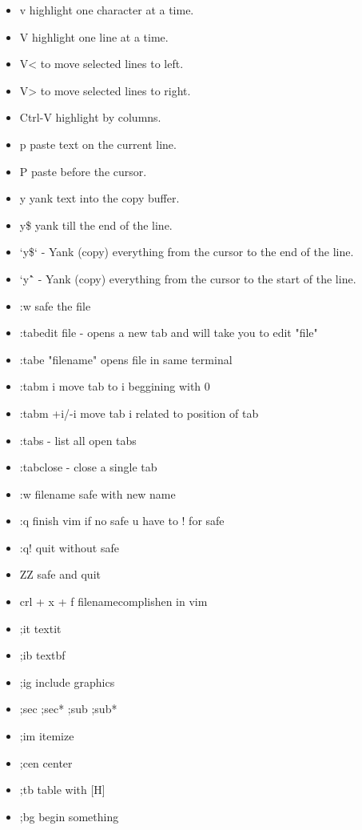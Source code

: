 \documentclass[12pt]{article}
\begin{document}
\begin{itemize}
    \item v highlight one character at a time.
    \item V highlight one line at a time.
    \item V< to move selected lines to left.
    \item V> to move selected lines to right.
    \item Ctrl-V highlight by columns.
    \item p paste text on the current line.
    \item P paste before the cursor.
    \item y yank text into the copy buffer.
    \item y\$ yank till the end of the line.
    \item `y\$` - Yank (copy) everything from the cursor to the end of the line.
    \item `y\^` - Yank (copy) everything from the cursor to the start of the line.\\

    \item :w  safe the file
    \item :tabedit file - opens a new tab and will take you to edit "file"
    \item :tabe "filename" opens file in same terminal 
    \item :tabm i move tab to i beggining with 0
    \item :tabm +i/-i move tab i related to position of tab
    \item :tabs - list all open tabs
    \item :tabclose - close a single tab
    \item :w filename safe with new name
    \item :q finish vim if no safe u have to ! for safe
    \item :q! quit without safe
    \item ZZ safe and quit
    \item crl + x + f filenamecomplishen in vim
    \item ;it textit{}
    \item ;ib textbf{}
    \item ;ig include graphics
    \item ;sec ;sec* ;sub ;sub*
    \item ;im itemize
    \item ;cen center
    \item ;tb table with [H]
    \item ;bg begin something


\end{itemize}
\end{document}
